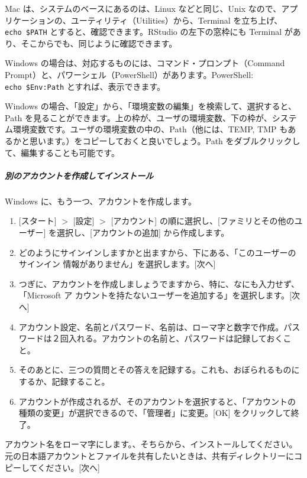 \documentclass[
]{bxjsbook}
\theoremstyle{definition}
\theoremstyle{definition}
\theoremstyle{definition}
\theoremstyle{definition}
\theoremstyle{remark}
\begin{document}
Mac は、システムのベースにあるのは、Linux などと同じ、Unix なので、アプリケーションの、ユーティリティ（Utilities）から、Terminal を立ち上げ、
\texttt{echo\ \$PATH} とすると、確認できます。RStudio の左下の窓枠にも Terminal があり、そこからでも、同じように確認できます。

Windows の場合は、対応するものには、コマンド・プロンプト（Command Prompt）と、パワーシェル（PowerShell）があります。PowerShell: \texttt{echo\ \$Env:Path} とすれば、表示できます。

Windows の場合、「設定」から、「環境変数の編集」を検索して、選択すると、Path を見ることができます。上の枠が、ユーザの環境変数、下の枠が、システム環境変数です。ユーザの環境変数の中の、Path（他には、TEMP, TMP もあるかと思います。）をコピーしておくと良いでしょう。Path をダブルクリックして、編集することも可能です。

\hypertarget{ux5225ux306eux30a2ux30abux30a6ux30f3ux30c8ux3092ux4f5cux6210ux3057ux3066ux30a4ux30f3ux30b9ux30c8ux30fcux30eb}{%
\subparagraph{別のアカウントを作成してインストール}\label{ux5225ux306eux30a2ux30abux30a6ux30f3ux30c8ux3092ux4f5cux6210ux3057ux3066ux30a4ux30f3ux30b9ux30c8ux30fcux30eb}}

Windows に、もう一つ、アカウントを作成します。

\begin{enumerate}
\def\labelenumi{\arabic{enumi}.}
\item
  {[}スタート{]} \(>\) {[}設定{]} \(>\) {[}アカウント{]} の順に選択し、{[}ファミリとその他のユーザー{]} を選択し、{[}アカウントの追加{]} から作成します。
\item
  どのようにサインインしますかと出ますから、下にある、「このユーザーのサインイン
  情報がありません」を選択します。{[}次へ{]}
\item
  つぎに、アカウントを作成しましょうでますから、特に、なにも入力せず、「Microsoft ア
  カウントを持たないユーザーを追加する」を選択します。{[}次へ{]}
\item
  アカウント設定、名前とパスワード、名前は、ローマ字と数字で作成。パスワードは２回入れる。アカウントの名前と、パスワードは記録しておくこと。
\item
  そのあとに、三つの質問とその答えを記録する。これも、おぼられるものにするか、記録すること。
\item
  アカウントが作成されるが、そのアカウントを選択すると、「アカウントの種類の変更」が選択できるので、「管理者」に変更。{[}OK{]} をクリックして終了。
\end{enumerate}

アカウント名をローマ字にします。、そちらから、インストールしてください。元の日本語アカウントとファイルを共有したいときは、共有ディレクトリーにコピーしてください。{[}次へ{]}
\end{document}
